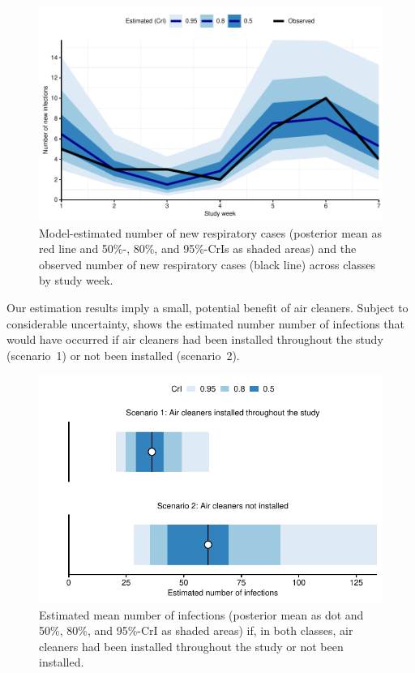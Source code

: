 \documentclass[fleqn,11pt]{wlscirep_supp}
\begin{document}
\begin{figure}[!htpb]
    \centering
    \includegraphics{../../results/epi-data/model-fit.pdf}
    \caption[Comparison of model-estimates with observed case data]{Model-estimated number of new respiratory cases (posterior mean as red line and 50\%-, 80\%, and 95\%-CrIs as shaded areas) and the observed number of new respiratory cases (black line) across classes by study week.}
    \label{fig:coverage}
\end{figure}

Our estimation results imply a small, potential benefit of air cleaners. Subject to considerable uncertainty,  shows the estimated number number of infections that would have occurred if air cleaners had been installed throughout the study (scenario~1) or not been installed (scenario~2). 

\begin{figure}[!htpb]
    \includegraphics{../../results/epi-data/avoided-infections.pdf}
    \caption[Estimated number of infections with and without air cleaners]{Estimated mean number of infections (posterior mean as dot and 50\%, 80\%, and 95\%-CrI as shaded areas) if, in both classes, air cleaners had been installed throughout the study or not been installed.}
    \label{fig:avoided-infections}
\end{figure}
\end{document}
